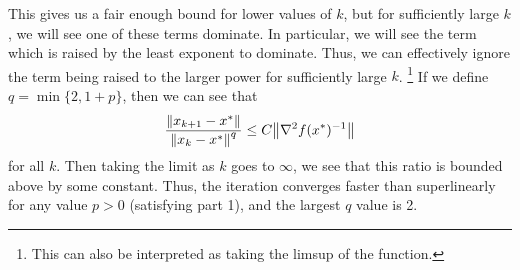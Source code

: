 \begin{solution}
    \newpage
    This gives us a fair enough bound for lower values of $k$, but for sufficiently large $k$, we will see one of these terms dominate. In particular, we will see the term which is raised by the least exponent to dominate. Thus, we can effectively ignore the term being raised to the larger power for sufficiently large $k$. \footnote{This can also be interpreted as taking the limsup of the function.} If we define $q = \min \{ 2, 1 + p \}$, then we can see that 
    \[\frac{\norm{x_{k+1} - x^{*}}}{\norm{x_k - x^{*}}^q} \leq C\norm{\nabla^2f(x^{*})^{-1}}\]
    for all $k$. Then taking the limit as $k$ goes to $\infty$, we see that this ratio is bounded above by some constant. Thus, the iteration converges faster than superlinearly for any value $p > 0$ (satisfying part 1), and the largest $q$ value is 2.
\end{solution}

\newpage
